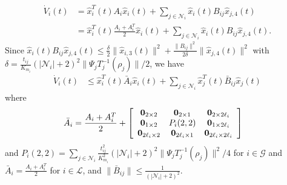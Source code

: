 \documentclass[journal]{IEEEtran}
\newcommand{\nnum}{\nonumber}
\newcommand{\GG}{{\mathcal{G}}}
\newcommand{\LL}{{\mathcal{L}}}
\newcommand{\NN}{{\mathcal{N}}}
\begin{document}
\begin{align*}
\dot{V}_{i}(t)&= \hat{x}_{i}^T(t) A_i \hat{x}_{i}(t)+\sum_{j \in {{\NN}}_i}\hat{x}_{i}(t)B_{ij}\hat{x}_{j,4}(t)\nnum\\
&= \hat{x}_{i}^T(t) \frac{A_i+A_i^T}{2} \hat{x}_{i}(t)+\sum_{j \in {{\NN}}_i}\hat{x}_{i}(t)B_{ij}\hat{x}_{j,4}(t).
\end{align*}
Since $\hat{x}_{i}(t)B_{ij}\hat{x}_{j,4}(t) \leq \frac{\delta}{2} \|\hat{x}_{i,3}(t)\|^2 + \frac{\|B_{ij}\|^2}{2\delta}\|\hat{x}_{j,4}(t)\|^2$ with $\delta=\frac{t_{ij}}{K_{m_i}}(|{{\NN}}_i|+2)^2\|\Psi_jT_j^{-1}(\rho_j)\|/2$, we have
\begin{align*}
\dot{V}_{i}(t)&\leq \hat{x}_{i}^T(t) \bar{A}_i \hat{x}_{i}(t)+\sum_{j \in {{\NN}}_i}\hat{x}_{j}^T(t)\bar{B}_{ij}\hat{x}_{j}(t)
\end{align*}
where 
\begin{align*}
&\bar{A}_i =\frac{A_i+A_i^T}{2}+
\left[
\begin{array}{ccc}
\bold{0}_{2 \times 2}& \bold{0}_{2 \times 1}&\bold{0}_{2 \times 2\ell_i}\\
\bold{0}_{1 \times 2}&P_i(2,2)& \bold{0}_{1 \times 2\ell_i}\\
\bold{0}_{2\ell_i \times 2}&\bold{0}_{2\ell_i \times 1}&\bold{0}_{2\ell_i \times 2\ell_i}\\
\end{array}
\right]
\end{align*}
and $P_i(2,2)=\sum_{j \in {{\NN}}_i}\frac{t_{ij}^2}{K_{m_i}^2}(|{{\NN}}_i|+2)^2\|\Psi_jT_j^{-1}(\rho_j)\|^2/4$
for $i \in {\GG}$ and $\bar{A}_i =\frac{A_i+A_i^T}{2}$ for $i\in{\LL}$, and $\|\bar{B}_{ij}\| \leq\frac{1}{(|{{\NN}}_i|+2)^2}$.
\end{document}
